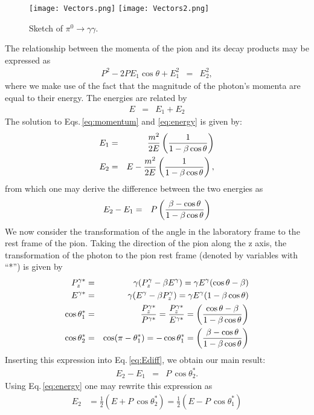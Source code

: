 \documentclass[12pt]{article}
\begin{document}
 \begin{figure}[tbh]
\begin{center}   
\texttt{[image: Vectors.png]} 
\texttt{[image: Vectors2.png]}     
\caption{Sketch of $\pi^0 \rightarrow \gamma \gamma$.
\label{fig:Vectors}
}
\end{center}  
\end{figure}

The relationship between the momenta of the pion and its decay products may be expressed as 
\begin{eqnarray}
P^2 - 2PE_1 \cos{\theta} + E_1^2 & = & E_2^2,     \label{eq:momentum}
\end{eqnarray}
where we make use of the fact that the magnitude of the photon's momenta are equal to their energy. The energies are related by
\begin{eqnarray}
E & = & E_1 + E_2           \label{eq:energy}
\end{eqnarray}
The solution to Eqs.\,\ref{eq:momentum} and \ref{eq:energy} is given by:
\begin{eqnarray}
E_1 & = & {m^2 \over 2E}  \left(1 \over 1 - \beta \cos{\theta} \right) \\
E_2 & = & E - {m^2 \over 2E}  \left(1 \over 1 - \beta \cos{\theta} \right),
\end{eqnarray}
from which one may derive the difference between the two energies as
\begin{eqnarray}
E_2 - E_1 & = & P \left(\beta -\cos{\theta} \over 1 - \beta \cos{\theta} \right)    \label{eq:Ediff}
\end{eqnarray}
We now consider the transformation of the angle in the laboratory frame to the rest frame of the pion. Taking  the direction of the pion along the z axis, the transformation of the photon to the pion rest frame 
(denoted by variables with ``*'') is given by
\begin{eqnarray} 
P^{\gamma*}_{z} & = & \gamma (P^\gamma_z - \beta E^\gamma) = \gamma E^\gamma (\cos{\theta} - \beta )  \\
E^{\gamma*} & = & \gamma (E^\gamma - \beta P^\gamma_z) = \gamma E^\gamma (1 - \beta\cos{\theta} )  \\
\cos{\theta^*_1} & = & { P^{\gamma*}_{z}  \over P^{\gamma*}} = { P^{\gamma*}_{z}  \over E^{\gamma*} } = \left( \cos{\theta} - \beta \over 1 - \beta \cos{\theta}  \right) \\
\cos{\theta^*_2} & = & \cos(\pi - \theta^*_1) = - \cos{\theta^*_1} = \left(\beta -\cos{\theta} \over 1 - \beta \cos{\theta} \right)
\end{eqnarray}
Inserting this expression into Eq.\,\ref{eq:Ediff}, we obtain our main result:
\begin{eqnarray}
E_2 - E_1 & = & P \, \cos{\theta^*_2}.    \label{eq:main}
\end{eqnarray}
Using Eq.\,\ref{eq:energy} one may rewrite this expression as
\begin{eqnarray}
E_2 & = \frac{1}{2}(E + P\,\cos{\theta^*_2}) = \frac{1}{2}(E - P\,\cos{\theta^*_1})   \label{eq:option2}
\end{eqnarray}
\end{document}
